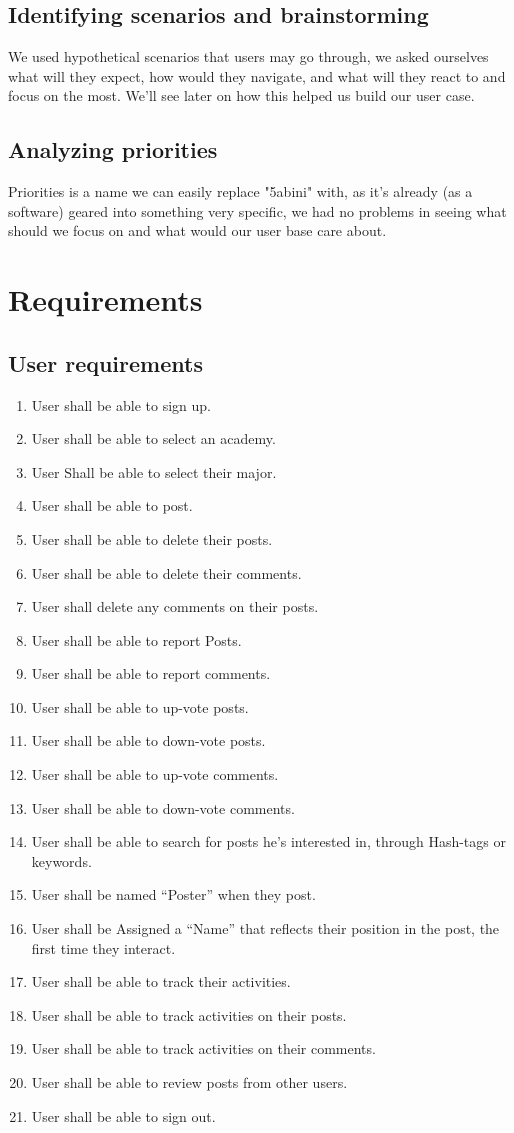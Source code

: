 \documentclass[12pt]{article}
\begin{document}
\subsection{Identifying scenarios and brainstorming}
We used hypothetical scenarios that users may go through, we asked ourselves what will they expect, how would they navigate, and what will they react to and focus on the most.
We'll see later on how this helped us build our user case.
\subsection{Analyzing priorities}
Priorities is a name we can easily replace "5abini" with, as it's already (as a software) geared into something very specific, we had no problems in seeing what should we focus on and what would our user base care about.
\section{Requirements}
\subsection{User requirements}
\begin{enumerate}
\itemsep0em 
\item User shall be able to sign up.
\item User shall be able to select an academy.
\item User Shall be able to select their major.
\item User shall be able to post.
\item User shall be able to delete their posts.
\item User shall be able to delete their comments.
\item User shall delete any comments on their posts.
\item User shall be able to report Posts.
\item User shall be able to report comments.
\item User shall be able to up-vote posts.
\item User shall be able to down-vote posts.
\item User shall be able to up-vote comments.
\item User shall be able to down-vote comments.
\item User shall be able to search for posts he's interested in, through Hash-tags or keywords.
\item User shall be named “Poster” when they post.
\item User shall be Assigned a “Name” that reflects their position in the post, the first time they interact.
\item User shall be able to track their activities.
\item User shall be able to track activities on their posts.
\item User shall be able to track activities on their comments.
\item User shall be able to review posts from other users.
\item User shall be able to sign out.

\end{enumerate}
\end{document}
